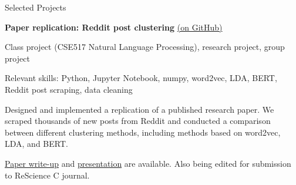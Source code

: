 \begin{rubric}{Selected Projects}

	\textbf{Paper replication: Reddit post clustering} \href{https://github.com/cephcyn/cse517project}{(on GitHub)}
	\par Class project (CSE517 Natural Language Processing), research project, group project
	\par Relevant skills: Python, Jupyter Notebook, numpy, word2vec, LDA, BERT, Reddit post scraping, data cleaning
	\par Designed and implemented a replication of a published research paper. We scraped thousands of new posts from Reddit and conducted a comparison between different clustering methods, including methods based on word2vec, LDA, and BERT.
	\par \href{https://github.com/cephcyn/cephcyn.github.io/raw/master/documents/u_cse517/final_writeup.pdf}{Paper write-up} and \href{https://www.youtube.com/watch?v=SgzpiQQEeEU}{presentation} are available. Also being edited for submission to ReScience C journal.

\end{rubric}
